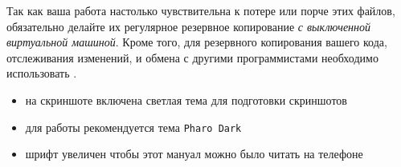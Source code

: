 Так как ваша работа настолько чувствительна к потере или порче этих файлов, обязательно делайте их регулярное резервное копирование
\emph{с выключенной виртуальной машиной}. Кроме того, для резервного копирования вашего кода, отслеживания изменений, и обмена с другими
программистами необходимо использовать .


\clearpage
{}



\begin{itemize}
\item на скриншоте включена светлая тема для подготовки скриншотов
\item для работы рекомендуется тема \texttt{Pharo Dark}
\item шрифт увеличен чтобы этот мануал можно было читать на телефоне
\end{itemize}    

